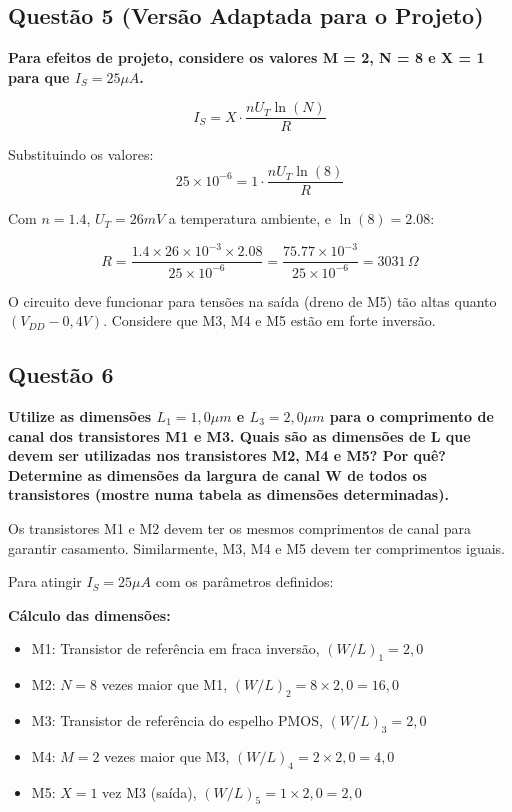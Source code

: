 \documentclass[12pt,a4paper]{article}
\begin{document}
\subsection*{Questão 5 (Versão Adaptada para o Projeto)}

\textbf{Para efeitos de projeto, considere os valores M = 2, N = 8 e X = 1 para que $I_S = 25 \mu A$.}

$$I_S = X \cdot \frac{nU_T \ln(N)}{R}$$

Substituindo os valores:
$$25 \times 10^{-6} = 1 \cdot \frac{nU_T \ln(8)}{R}$$

Com $n = 1.4$, $U_T = 26mV$ a temperatura ambiente, e $\ln(8) = 2.08$:

$$R = \frac{1.4 \times 26 \times 10^{-3} \times 2.08}{25 \times 10^{-6}} = \frac{75.77 \times 10^{-3}}{25 \times 10^{-6}} = 3031 \, \Omega$$

O circuito deve funcionar para tensões na saída (dreno de M5) tão altas quanto $(V_{DD} - 0,4V)$. Considere que M3, M4 e M5 estão em forte inversão.

\subsection*{Questão 6}

\textbf{Utilize as dimensões $L_1 = 1,0 \mu m$ e $L_3 = 2,0 \mu m$ para o comprimento de canal dos transistores M1 e M3. Quais são as dimensões de L que devem ser utilizadas nos transistores M2, M4 e M5? Por quê? Determine as dimensões da largura de canal W de todos os transistores (mostre numa tabela as dimensões determinadas).} 

Os transistores M1 e M2 devem ter os mesmos comprimentos de canal para garantir casamento. Similarmente, M3, M4 e M5 devem ter comprimentos iguais.

Para atingir $I_S = 25 \mu A$ com os parâmetros definidos:

\textbf{Cálculo das dimensões:}
\begin{itemize}
    \item M1: Transistor de referência em fraca inversão, $(W/L)_1 = 2,0$
    \item M2: $N = 8$ vezes maior que M1, $(W/L)_2 = 8 \times 2,0 = 16,0$
    \item M3: Transistor de referência do espelho PMOS, $(W/L)_3 = 2,0$
    \item M4: $M = 2$ vezes maior que M3, $(W/L)_4 = 2 \times 2,0 = 4,0$
    \item M5: $X = 1$ vez M3 (saída), $(W/L)_5 = 1 \times 2,0 = 2,0$
\end{itemize}
\end{document}

